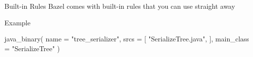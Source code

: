 \documentclass[aspectratio=169]{beamer}
\begin{document}
\begin{body-slide}{Built-in Rules}
Bazel comes with built-in rules that you can use straight away

\end{body-slide}

\begin{body-slide}{Example}
\begin{bazel}
java_binary(
    name = "tree_serializer",
    srcs = [
        "SerializeTree.java",
    ],
    main_class = "SerializeTree"
)
\end{bazel}
\end{body-slide}
\end{document}
